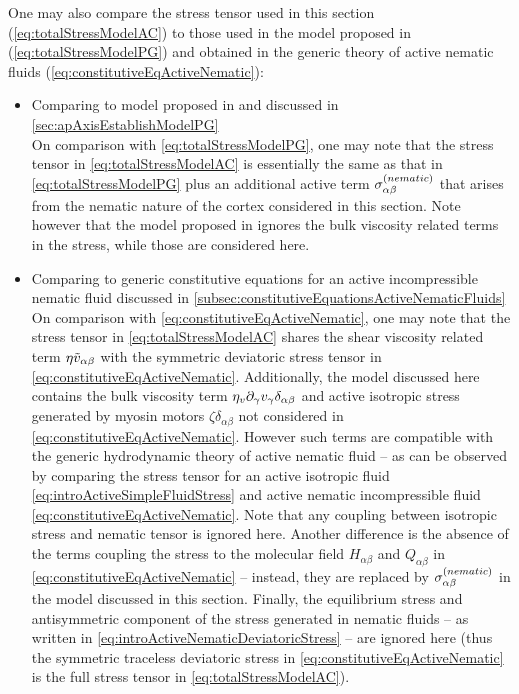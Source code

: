 One may also compare the stress tensor used in this section (\autoref{eq:totalStressModelAC}) to those used in the model proposed in \cite{gross2019guiding} (\autoref{eq:totalStressModelPG}) and obtained in the generic theory of active nematic fluids (\autoref{eq:constitutiveEqActiveNematic}):
\begin{itemize}
    \item Comparing to model proposed in \cite{gross2019guiding} and discussed in \autoref{sec:apAxisEstablishModelPG}\hfill\\
    On comparison with \autoref{eq:totalStressModelPG}, one may note that the stress tensor in \autoref{eq:totalStressModelAC} is essentially the same as that in \autoref{eq:totalStressModelPG} plus an additional active term $\sigma^{(nematic)}_{\alpha\beta}$ that arises from the nematic nature of the cortex considered in this section. Note however that the model proposed in \cite{gross2019guiding} ignores the bulk viscosity related terms in the stress, while those are considered here.
    \item Comparing to generic constitutive equations for an active incompressible nematic fluid \citep{julicher2018hydrodynamic} discussed in \autoref{subsec:constitutiveEquationsActiveNematicFluids}\hfill\\
    On comparison with \autoref{eq:constitutiveEqActiveNematic}, one may note that the stress tensor in \autoref{eq:totalStressModelAC} shares the shear viscosity related term $\eta \Tilde{v}_{\alpha\beta}$ with the symmetric deviatoric stress tensor in \autoref{eq:constitutiveEqActiveNematic}. Additionally, the model discussed here contains the bulk viscosity term $\eta_v \inlinePartial{\gamma}{v_\gamma}\delta_{\alpha\beta}$ and active isotropic stress generated by myosin motors $\zeta \delta_{\alpha\beta}$ not considered in \autoref{eq:constitutiveEqActiveNematic}. However such terms are compatible with the generic hydrodynamic theory of active nematic fluid -- as can be observed by comparing the stress tensor for an active isotropic fluid \autoref{eq:introActiveSimpleFluidStress} and active nematic incompressible fluid \autoref{eq:constitutiveEqActiveNematic}. Note that any coupling between isotropic stress and nematic tensor is ignored here. Another difference is the absence of the terms coupling the stress to the molecular field $H_{\alpha\beta}$ and $Q_{\alpha\beta}$ in \autoref{eq:constitutiveEqActiveNematic} -- instead, they are replaced by $\sigma^{(nematic)}_{\alpha\beta}$ in the model discussed in this section. Finally, the equilibrium stress and antisymmetric component of the stress generated in nematic fluids -- as written in \autoref{eq:introActiveNematicDeviatoricStress} -- are ignored here (thus the symmetric traceless deviatoric stress in \autoref{eq:constitutiveEqActiveNematic} is the full stress tensor in \autoref{eq:totalStressModelAC}).
\end{itemize}

